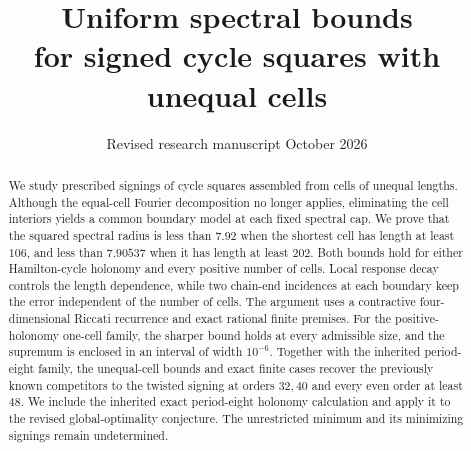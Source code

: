 \documentclass[11pt]{article}
\title{Uniform spectral bounds\\for signed cycle squares with unequal cells}
\author{}
\date{Revised research manuscript\quad 5 October 2026}
\theoremstyle{remark}\newtheorem{remark}[theorem]{Remark}
\begin{document}
\maketitle
\begin{abstract}
We study prescribed signings of cycle squares assembled from cells of
unequal lengths. Although the equal-cell Fourier decomposition no longer
applies, eliminating the cell interiors yields a common boundary model
at each fixed spectral cap. We prove that the squared spectral radius is
less than $7.92$ when the shortest cell has length at least $106$, and
less than $7.90537$ when it has length at least $202$. Both bounds hold
for either Hamilton-cycle holonomy and every positive number of cells.
Local response decay controls the length dependence, while two chain-end
incidences at each boundary keep the error independent of the number of
cells. The argument uses a contractive four-dimensional Riccati recurrence
and exact rational finite premises. For the positive-holonomy one-cell
family, the sharper bound holds at every admissible size, and the supremum
is enclosed in an interval of width $10^{-6}$. Together with the inherited
period-eight family, the unequal-cell bounds and exact finite cases
recover the previously known competitors to the twisted signing at orders
$32,40$ and every even order at least $48$. We include the inherited exact
period-eight holonomy calculation and apply it to the revised
global-optimality conjecture. The unrestricted minimum and its minimizing
signings remain undetermined.
\end{abstract}








\end{document}
